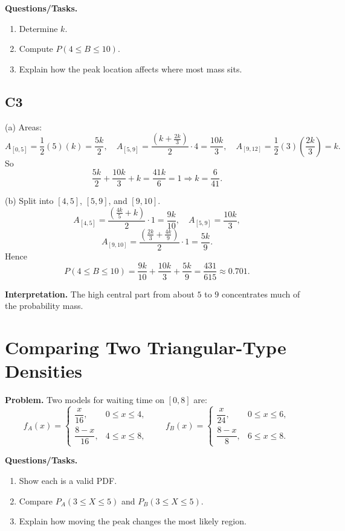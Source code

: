 \textbf{Questions/Tasks.}
\begin{enumerate}[label=(\alph*)]
\item Determine $k$.
\item Compute $P(4\le B\le 10)$.
\item Explain how the peak location affects where most mass sits.
\end{enumerate}

\subsection*{C3}
(a) Areas:
\[
A_{[0,5]}=\frac12(5)(k)=\frac{5k}{2},
\quad
A_{[5,9]}=\frac{(k+\frac{2k}{3})}{2}\cdot4=\frac{10k}{3},
\quad
A_{[9,12]}=\frac12(3)\left(\frac{2k}{3}\right)=k.
\]
So
\[
\frac{5k}{2}+\frac{10k}{3}+k=\frac{41k}{6}=1
\Rightarrow k=\frac{6}{41}.
\]

(b) Split into $[4,5]$, $[5,9]$, and $[9,10]$.
\[
A_{[4,5]}=\frac{\left(\frac{4k}{5}+k\right)}{2}\cdot1=\frac{9k}{10},
\quad
A_{[5,9]}=\frac{10k}{3},
\]
\[
A_{[9,10]}=\frac{\left(\frac{2k}{3}+\frac{4k}{9}\right)}{2}\cdot1=\frac{5k}{9}.
\]
Hence
\[
P(4\le B\le 10)=\frac{9k}{10}+\frac{10k}{3}+\frac{5k}{9}=\frac{431}{615}\approx0.701.
\]

\textbf{Interpretation.}
The high central part from about $5$ to $9$ concentrates much of the probability mass.

\section{Comparing Two Triangular-Type Densities}

\textbf{Problem.}
Two models for waiting time on $[0,8]$ are:
\[
f_A(x)=\begin{cases}
\dfrac{x}{16}, & 0\le x\le 4,\\
\dfrac{8-x}{16}, & 4\le x\le 8,
\end{cases}
\qquad
f_B(x)=\begin{cases}
\dfrac{x}{24}, & 0\le x\le 6,\\
\dfrac{8-x}{8}, & 6\le x\le 8.
\end{cases}
\]

\textbf{Questions/Tasks.}
\begin{enumerate}[label=(\alph*)]
\item Show each is a valid PDF.
\item Compare $P_A(3\le X\le 5)$ and $P_B(3\le X\le 5)$.
\item Explain how moving the peak changes the most likely region.
\end{enumerate}

